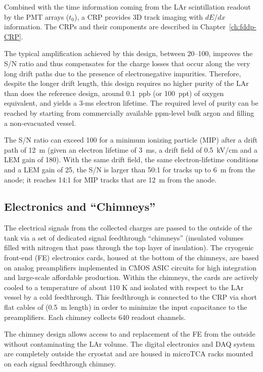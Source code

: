 Combined with the time information coming from the LAr scintillation readout by
the PMT arrays ($t_0$), a CRP provides 3D track imaging with $dE/dx$ information. 
The CRPs and their components are described in Chapter~\ref{ch:fddp-CRP}.

The typical amplification achieved by this design, between 20--100, improves the S/N ratio and thus 
compensates for the charge losses that occur along the very long drift paths due to the presence of 
electronegative impurities. Therefore, despite the longer drift length, this design requires no higher 
purity of the LAr than does the reference design, around 0.1~ppb (or 100~ppt) of oxygen equivalent,
and yields a 3-ms electron lifetime. The required level of purity can be reached by starting from 
commercially available ppm-level bulk argon and filling a non-evacuated vessel\cite{WA105_TDR}.

The S/N ratio can exceed 100 for a minimum
ionizing particle (MIP) after a drift path of 12~m (given an
electron lifetime of 3~ms, a drift field of 0.5~kV/cm and a LEM gain
of 180). With the same drift field, the same electron-lifetime conditions and a
LEM gain of 25, the S/N is larger than 50:1 for tracks up to 6~m from
the anode; it reaches 14:1 for MIP tracks that are 12~m from the
anode.


\subsection{Electronics and ``Chimneys''}
 
The electrical signals from the collected charges
are passed to the outside of the tank via a set of dedicated signal
feedthrough ``chimneys'' (insulated volumes filled with nitrogen
that pass through the top layer of insulation). 
The cryogenic front-end (FE) electronics cards, housed at the bottom of the
chimneys, are based on analog preamplifiers implemented in CMOS ASIC circuits for high integration and large-scale
affordable production. Within the chimneys, the cards are actively cooled to a temperature of about 110 K and
isolated with respect to the LAr vessel by a cold feedthrough.  This
feedthrough is connected to the CRP via short flat cables of (0.5~m length) in order to minimize the
input capacitance to the preamplifiers. Each chimney collects 640 readout channels.

The chimney design allows access to and replacement of the FE from the
outside without contaminating the LAr volume. The digital electronics
and DAQ system are completely outside the cryostat and are housed in
microTCA racks mounted on each signal feedthrough chimney. 

